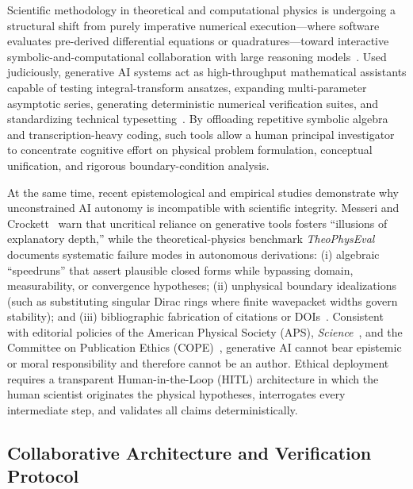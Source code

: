 \documentclass[aps,pra,reprint,amsmath,amssymb,floatfix,longbibliography]{revtex4-2}
\begin{document}
Scientific methodology in theoretical and computational physics is undergoing a structural shift from purely imperative numerical execution—where software evaluates pre-derived differential equations or quadratures—toward interactive symbolic-and-computational collaboration with large reasoning models~\cite{Wang2023NatureAI,OToole2024,VillaescusaNavarro2025}. Used judiciously, generative AI systems act as high-throughput mathematical assistants capable of testing integral-transform ansatzes, expanding multi-parameter asymptotic series, generating deterministic numerical verification suites, and standardizing technical typesetting~\cite{Haber2025,Jauhiainen2026}. By offloading repetitive symbolic algebra and transcription-heavy coding, such tools allow a human principal investigator to concentrate cognitive effort on physical problem formulation, conceptual unification, and rigorous boundary-condition analysis.

At the same time, recent epistemological and empirical studies demonstrate why unconstrained AI autonomy is incompatible with scientific integrity. Messeri and Crockett~\cite{Messeri2024} warn that uncritical reliance on generative tools fosters ``illusions of explanatory depth,'' while the theoretical-physics benchmark \emph{TheoPhysEval}~\cite{Chandra2026TheoPhysEval} documents systematic failure modes in autonomous derivations: (i) algebraic ``speedruns'' that assert plausible closed forms while bypassing domain, measurability, or convergence hypotheses; (ii) unphysical boundary idealizations (such as substituting singular Dirac rings where finite wavepacket widths govern stability); and (iii) bibliographic fabrication of citations or DOIs~\cite{Kacena2024}. Consistent with editorial policies of the American Physical Society (APS), \emph{Science}~\cite{Thorp2023Science}, and the Committee on Publication Ethics (COPE)~\cite{COPE2023AI}, generative AI cannot bear epistemic or moral responsibility and therefore cannot be an author. Ethical deployment requires a transparent Human-in-the-Loop (HITL) architecture in which the human scientist originates the physical hypotheses, interrogates every intermediate step, and validates all claims deterministically.

\subsection{Collaborative Architecture and Verification Protocol}
\label{subsec:ai_architecture}
\end{document}
